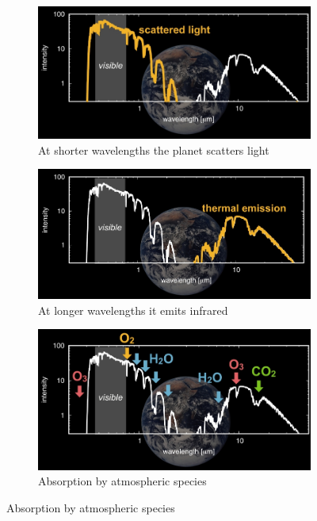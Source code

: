 \documentclass[]{article}
\begin{document}
\begin{figure}[H]
\begin{subfigure}[b]{0.3\textwidth}
	\end{subfigure}
	\begin{subfigure}[b]{0.3\textwidth}
		\caption{At shorter wavelengths the planet scatters light}\label{fig:spectrum:earth:twin1}
		\includegraphics[width=\textwidth]{SpectrumEarthTwin1}
	\end{subfigure}
	\begin{subfigure}[b]{0.45\textwidth}
		\caption{At longer wavelengths it emits infrared}\label{fig:spectrum:earth:twin2}
		\includegraphics[width=\textwidth]{SpectrumEarthTwin2}
	\end{subfigure}
	\begin{subfigure}[b]{0.45\textwidth}
		\caption{Absorption by atmospheric species}\label{fig:spectrum:earth:twin3}
		\includegraphics[width=\textwidth]{SpectrumEarthTwin3}
	\end{subfigure}
\end{figure}
\end{document}
